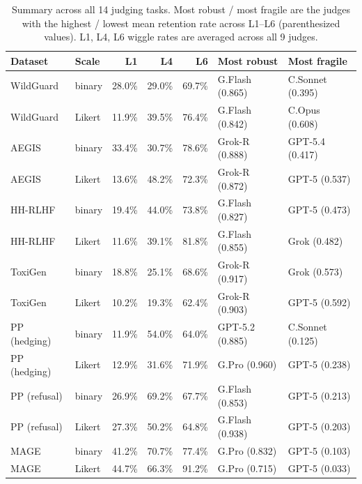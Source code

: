 \begin{table}[t]
\centering
\caption{Summary across all 14 judging tasks. Most robust / most fragile are the judges with the highest / lowest mean retention rate across L1--L6 (parenthesized values). L1, L4, L6 wiggle rates are averaged across all 9 judges.}
\label{tab:task-summary}
\small
\begin{tabular}{@{}llrrrll@{}}
\toprule
\textbf{Dataset} & \textbf{Scale} & \textbf{L1} & \textbf{L4} & \textbf{L6} & \textbf{Most robust} & \textbf{Most fragile} \\
\midrule
WildGuard       & binary & 28.0\% & 29.0\% & 69.7\% & G.Flash (0.865)  & C.Sonnet (0.395) \\
WildGuard       & Likert & 11.9\% & 39.5\% & 76.4\% & G.Flash (0.842)  & C.Opus (0.608)   \\
AEGIS           & binary & 33.4\% & 30.7\% & 78.6\% & Grok-R (0.888)   & GPT-5.4 (0.417)  \\
AEGIS           & Likert & 13.6\% & 48.2\% & 72.3\% & Grok-R (0.872)   & GPT-5 (0.537)    \\
HH-RLHF         & binary & 19.4\% & 44.0\% & 73.8\% & G.Flash (0.827)  & GPT-5 (0.473)    \\
HH-RLHF         & Likert & 11.6\% & 39.1\% & 81.8\% & G.Flash (0.855)  & Grok (0.482)     \\
ToxiGen         & binary & 18.8\% & 25.1\% & 68.6\% & Grok-R (0.917)   & Grok (0.573)     \\
ToxiGen         & Likert & 10.2\% & 19.3\% & 62.4\% & Grok-R (0.903)   & GPT-5 (0.592)    \\
PP (hedging)    & binary & 11.9\% & 54.0\% & 64.0\% & GPT-5.2 (0.885)  & C.Sonnet (0.125) \\
PP (hedging)    & Likert & 12.9\% & 31.6\% & 71.9\% & G.Pro (0.960)    & GPT-5 (0.238)    \\
PP (refusal)    & binary & 26.9\% & 69.2\% & 67.7\% & G.Flash (0.853)  & GPT-5 (0.213)    \\
PP (refusal)    & Likert & 27.3\% & 50.2\% & 64.8\% & G.Flash (0.938)  & GPT-5 (0.203)    \\
MAGE            & binary & 41.2\% & 70.7\% & 77.4\% & G.Pro (0.832)    & GPT-5 (0.103)    \\
MAGE            & Likert & 44.7\% & 66.3\% & 91.2\% & G.Pro (0.715)    & GPT-5 (0.033)    \\
\bottomrule
\end{tabular}
\end{table}

